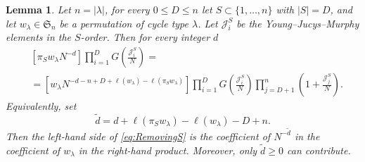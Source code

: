 \documentclass{article}
\theoremstyle{plain}
\newtheorem{lemma}[thm]{Lemma}
\theoremstyle{definition}
\numberwithin{equation}{section}
\begin{document}
\begin{lemma}
    \label{lem:removeS}
    Let $n=|\lambda|$, for every $0 \le D \le n$ let $S\subset\{1,\dots,n\}$ with $|S|=D$, and let $w_\lambda\in\mathfrak{S}_n$ be a permutation of cycle type $\lambda$. Let $\mathcal{J}_i^S$ be the Young--Jucys--Murphy elements in the $S$-order. Then for every integer $d$
    \begin{equation}
        \label{eq:RemovingS}
        \begin{aligned}
            & \left[\pi_S w_\lambda N^{-d}\right] \prod_{i=1}^{D} G\left(\frac{\mathcal{J}_{i}^S}{N} \right) = \\
            & = \left[w_\lambda N^{-d - n+D + \ell(w_\lambda) - \ell(\pi_S w_\lambda)}\right] \prod_{i=1}^{D} G\left(\frac{\mathcal{J}_{i}^S}{N} \right) \prod_{j=D+1}^n \left(1+\frac{\mathcal{J}_{j}^S}{N}\right).
        \end{aligned}
    \end{equation}
    Equivalently, set
    \begin{equation}
        \label{eq:d_to_tilded}
        \tilde d = d + \ell(\pi_S w_\lambda) - \ell(w_\lambda) - D+n.
    \end{equation}
    Then the left-hand side of \eqref{eq:RemovingS} is the coefficient of $N^{-\tilde d}$ in the coefficient of $w_\lambda$ in the right-hand product. Moreover, only $\tilde d\ge 0$ can contribute.
\end{lemma}
\end{document}
